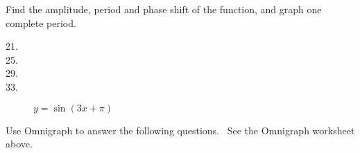 Find the amplitude, period and phase shift of the function,
and graph one complete period. 


\begin{description}
\item [21.]   
\columnsep =30pt
 

\item [25.]
\columnsep =30pt
 

\item [29.]
\columnsep =30pt
 

\item [33.]
$y =\sin  \left (3 x +\pi \right )$ \end{description}

Use Omnigraph to answer the following questions. \ See
the Omnigraph worksheet above. 

